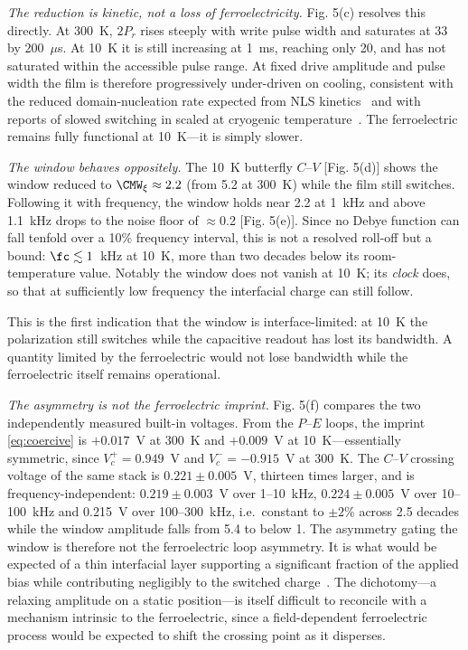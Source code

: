 \textit{The reduction is kinetic, not a loss of ferroelectricity.}
Fig. 5(c) resolves this directly. At 300~K, $2P_r$ rises
steeply with write pulse width and saturates at 33\uCcm{} by 200~$\mu$s. At
10~K it is still increasing at 1~ms, reaching only 20\uCcm{}, and has not
saturated within the accessible pulse range. At fixed drive amplitude and
pulse width the film is therefore progressively under-driven on cooling,
consistent with the reduced domain-nucleation rate expected from NLS
kinetics~\cite{tagantsev2002} and with reports of slowed switching in scaled
\hzo{} at cryogenic temperature~\cite{das2026cryo}. The ferroelectric remains
fully functional at 10~K---it is simply slower.

\textit{The window behaves oppositely.} The 10~K butterfly $C$--$V$
[Fig. 5(d)] shows the window reduced to $\CMW_\xi \approx 2.2$
(from 5.2 at 300~K) while the film still switches. Following it with
frequency, the window holds near 2.2 at 1~kHz and above 1.1~kHz
drops to the noise floor of $\approx$0.2 [Fig. 5(e)].
Since no Debye function can fall tenfold over a 10\% frequency interval, this
is not a resolved roll-off but a bound: $\fc \lesssim 1$~kHz at 10~K, more
than two decades below its room-temperature value. Notably the window does
not vanish at 10~K; its \emph{clock} does, so that at sufficiently low
frequency the interfacial charge can still follow.

This is the first indication that the window is interface-limited: at 10~K
the polarization still switches while the capacitive readout has lost its
bandwidth. A quantity limited by the ferroelectric would not lose bandwidth
while the ferroelectric itself remains operational.

\textit{The asymmetry is not the ferroelectric imprint.}
Fig. 5(f) compares the two independently measured
built-in voltages. From the $P$--$E$ loops, the imprint \eqref{eq:coercive}
is $+0.017$~V at 300~K and $+0.009$~V at 10~K---essentially symmetric, since
$V_c^{+} = 0.949$~V and $V_c^{-} = -0.915$~V at 300~K. The $C$--$V$ crossing
voltage of the same stack is $0.221 \pm 0.005$~V, thirteen times larger, and
is frequency-independent: $0.219 \pm 0.003$~V over 1--10~kHz,
$0.224 \pm 0.005$~V over 10--100~kHz and 0.215~V over 100--300~kHz, i.e.\
constant to $\pm2$\% across 2.5 decades while the window amplitude falls from
5.4 to below 1. The asymmetry gating the window is therefore not the
ferroelectric loop asymmetry. It is what would be expected of a thin
interfacial layer supporting a significant fraction of the applied bias while
contributing negligibly to the switched
charge~\cite{alcala2023,schenk2014apr,li2024imprint}. The dichotomy---a
relaxing amplitude on a static position---is itself difficult to reconcile
with a mechanism intrinsic to the ferroelectric, since a field-dependent
ferroelectric process would be expected to shift the crossing point as it
disperses.
 

